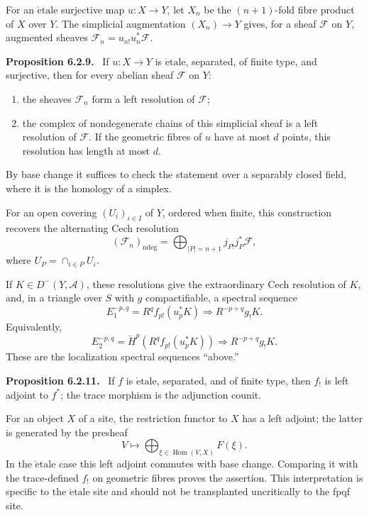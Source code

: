 \documentclass[12pt]{article}
\newcommand{\Aa}{\mathcal A}
\newcommand{\Ff}{\mathcal F}
\DeclareMathOperator{\Hom}{Hom}
\newenvironment{statement}[1]{\par\medskip\noindent\textbf{#1.}\ }{\par\medskip}
\begin{document}
For an \(\mathrm{\acute{e}tale}\) surjective map \(u:X\to Y\), let \(X_n\) be the \((n+1)\)-fold fibre product of \(X\) over \(Y\). The simplicial augmentation \((X_n)\to Y\) gives, for a sheaf \(\Ff\) on \(Y\), augmented sheaves \(\Ff_n=u_{n!}u_n^*\Ff\).

\begin{statement}{Proposition 6.2.9}
If \(u:X\to Y\) is \(\mathrm{\acute{e}tale}\), separated, of finite type, and surjective, then for every abelian sheaf \(\Ff\) on \(Y\):
\begin{enumerate}[label=(\roman*)]
\item the sheaves \(\Ff_n\) form a left resolution of \(\Ff\);
\item the complex of nondegenerate chains of this simplicial sheaf is a left resolution of \(\Ff\). If the geometric fibres of \(u\) have at most \(d\) points, this resolution has length at most \(d\).
\end{enumerate}
\end{statement}

By base change it suffices to check the statement over a separably closed field, where it is the homology of a simplex.

For an open covering \((U_i)_{i\in I}\) of \(Y\), ordered when finite, this construction recovers the alternating Cech resolution
\[
(\Ff_n)_{\mathrm{ndeg}}=\bigoplus_{|P|=n+1}j_{P!}j_P^*\Ff,
\]
where \(U_P=\cap_{i\in P}U_i\).

If \(K\in D^-(Y,\Aa)\), these resolutions give the extraordinary Cech resolution of \(K\), and, in a triangle over \(S\) with \(g\) compactifiable, a spectral sequence
\[
E_1^{-p,q}=R^qf_{p!}(u_p^*K)\Longrightarrow R^{-p+q}g_!K.
\]
Equivalently,
\[
E_2^{-p,q}=\check H^p(R^qf_{p!}(u_p^*K))\Longrightarrow R^{-p+q}g_!K.
\]
These are the localization spectral sequences ``above.''

\begin{statement}{Proposition 6.2.11}
If \(f\) is \(\mathrm{\acute{e}tale}\), separated, and of finite type, then \(f_!\) is left adjoint to \(f^*\); the trace morphism is the adjunction counit.
\end{statement}

For an object \(X\) of a site, the restriction functor to \(X\) has a left adjoint; the latter is generated by the presheaf
\[
V\longmapsto\bigoplus_{\xi\in\Hom(V,X)}F(\xi).
\]
In the \(\mathrm{\acute{e}tale}\) case this left adjoint commutes with base change. Comparing it with the trace-defined \(f_!\) on geometric fibres proves the assertion. This interpretation is specific to the \(\mathrm{\acute{e}tale}\) site and should not be transplanted uncritically to the fpqf site.
\end{document}
